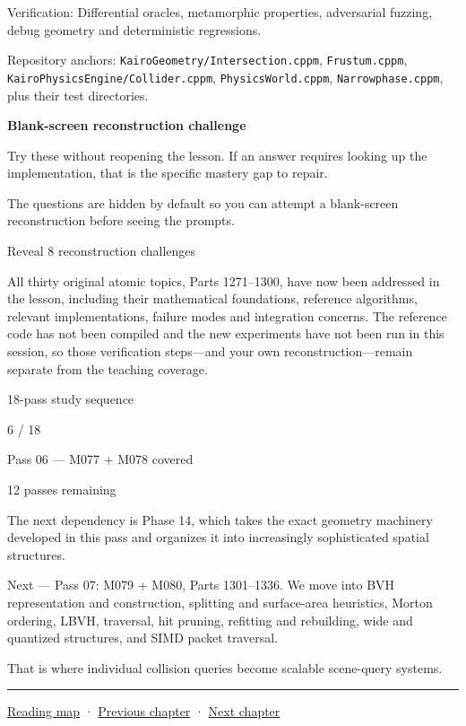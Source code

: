 Verification: Differential oracles, metamorphic properties, adversarial fuzzing, debug geometry and deterministic regressions.

Repository anchors: \texttt{KairoGeometry/Intersection.cppm}, \texttt{Frustum.cppm}, \texttt{KairoPhysicsEngine/Collider.cppm}, \texttt{PhysicsWorld.cppm}, \texttt{Narrowphase.cppm}, plus their test directories.

\textbf{Blank-screen reconstruction challenge}

Try these without reopening the lesson. If an answer requires looking up the implementation, that is the specific mastery gap to repair.

The questions are hidden by default so you can attempt a blank-screen reconstruction before seeing the prompts.

Reveal 8 reconstruction challenges

All thirty original atomic topics, Parts 1271--1300, have now been addressed in the lesson, including their mathematical foundations, reference algorithms, relevant implementations, failure modes and integration concerns. The reference code has not been compiled and the new experiments have not been run in this session, so those verification steps---and your own reconstruction---remain separate from the teaching coverage.

18-pass study sequence

6 / 18

Pass 06 --- M077 + M078 covered

12 passes remaining

The next dependency is Phase 14, which takes the exact geometry machinery developed in this pass and organizes it into increasingly sophisticated spatial structures.

Next --- Pass 07: M079 + M080, Parts 1301--1336. We move into BVH representation and construction, splitting and surface-area heuristics, Morton ordering, LBVH, traversal, hit pruning, refitting and rebuilding, wide and quantized structures, and SIMD packet traversal.

That is where individual collision queries become scalable scene-query systems.

\begin{center}\rule{0.5\linewidth}{0.5pt}\end{center}

\hyperref[volume-reading-map]{Reading map} · \hyperref[04-visual-computing-ii-ch026-contact-features-and-manifolds]{Previous chapter} · \hyperref[04-visual-computing-ii-ch028-visibility-queries-and-ray-intersections]{Next chapter}
